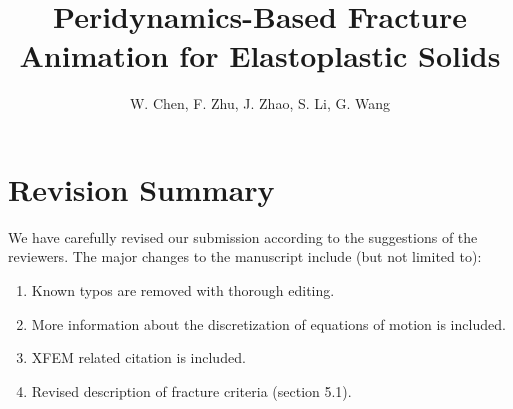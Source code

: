 

\title[Peridynamics-Based Fracture Animation for Elastoplastic Solids]%
      {Peridynamics-Based Fracture Animation for Elastoplastic Solids}

\author[W. Chen et al.]{W. Chen, F. Zhu, J. Zhao,
  S. Li, G. Wang}



%



\maketitle

\section{Revision Summary}

We have carefully revised our submission according to the suggestions of the reviewers. The major changes to the manuscript include (but not limited to):
\begin{enumerate}
\item{Known typos are removed with thorough editing.}
\item{More information about the discretization of equations of motion is included.}
\item{XFEM related citation is included.}
\item{Revised description of fracture criteria (section 5.1).}
\end{enumerate}

